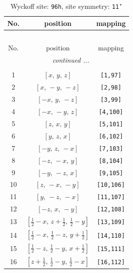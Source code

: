 \documentclass[fleqn,8pt]{jsarticle}
\begin{document}
\begin{longtable}{ccc}
\caption{Wyckoff site: {\tt 96h}, site symmetry: {\tt 11'}}
 \\
 \hline \hline
No. & position & mapping \\ \hline \endfirsthead

\multicolumn{2}{l}{\tablename\ \thetable{}} \\
 \hline \hline
No. & position & mapping \\ \hline \endhead

 \hline \hline
\multicolumn{2}{r}{\footnotesize\it continued ...} \\ \endfoot

 \hline \hline
\multicolumn{2}{r}{} \\ \endlastfoot

1 & $\left[ x,\, y,\, z \right]$ & {\tt [1,97]} \\ \hline
2 & $\left[ x,\, - y,\, - z \right]$ & {\tt [2,98]} \\ \hline
3 & $\left[ - x,\, y,\, - z \right]$ & {\tt [3,99]} \\ \hline
4 & $\left[ - x,\, - y,\, z \right]$ & {\tt [4,100]} \\ \hline
5 & $\left[ z,\, x,\, y \right]$ & {\tt [5,101]} \\ \hline
6 & $\left[ y,\, z,\, x \right]$ & {\tt [6,102]} \\ \hline
7 & $\left[ - y,\, z,\, - x \right]$ & {\tt [7,103]} \\ \hline
8 & $\left[ - z,\, - x,\, y \right]$ & {\tt [8,104]} \\ \hline
9 & $\left[ - y,\, - z,\, x \right]$ & {\tt [9,105]} \\ \hline
10 & $\left[ z,\, - x,\, - y \right]$ & {\tt [10,106]} \\ \hline
11 & $\left[ y,\, - z,\, - x \right]$ & {\tt [11,107]} \\ \hline
12 & $\left[ - z,\, x,\, - y \right]$ & {\tt [12,108]} \\ \hline
13 & $\left[ \frac{1}{2} - x,\, z + \frac{1}{2},\, \frac{1}{2} - y \right]$ & {\tt [13,109]} \\ \hline
14 & $\left[ \frac{1}{2} - x,\, \frac{1}{2} - z,\, y + \frac{1}{2} \right]$ & {\tt [14,110]} \\ \hline
15 & $\left[ \frac{1}{2} - z,\, \frac{1}{2} - y,\, x + \frac{1}{2} \right]$ & {\tt [15,111]} \\ \hline
16 & $\left[ z + \frac{1}{2},\, \frac{1}{2} - y,\, \frac{1}{2} - x \right]$ & {\tt [16,112]} \\ \hline

\end{longtable}
\end{document}
